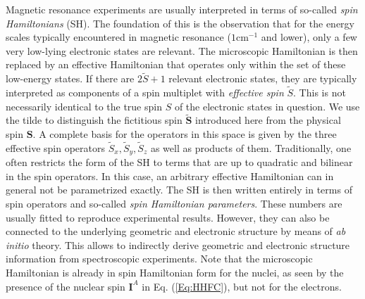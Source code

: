 Magnetic resonance experiments are usually interpreted in terms of so-called \emph{spin Hamiltonians} (SH). The foundation of this is the observation that for the energy scales typically encountered in magnetic resonance ($1\text{cm}^{-1}$ and lower), only a few very low-lying electronic states are relevant. The microscopic Hamiltonian is then replaced by an effective Hamiltonian that operates only within the set of these low-energy states. If there are $2\tilde{S}+1$ relevant electronic states, they are typically interpreted as components of a spin multiplet with \emph{effective spin} $\tilde{S}$. This is not necessarily identical to the true spin $S$ of the electronic states in question. We use the tilde to distinguish the fictitious spin $\tilde{\mathbf{S}}$ introduced here from the physical spin $\mathbf{S}$. A complete basis for the operators in this space is given by the three effective spin operators $\tilde{S}_x, \tilde{S}_y, \tilde{S}_z$ as well as products of them.\cite{Griff_1960_457, Griff_1963_316, HeuveS_2013_54113} Traditionally, one often restricts the form of the SH to terms that are up to quadratic and bilinear in the spin operators. In this case, an arbitrary effective Hamiltonian can in general not be parametrized exactly. The SH is then written entirely in terms of spin operators and so-called \emph{spin Hamiltonian parameters}. These numbers are usually fitted to reproduce experimental results. However, they can also be connected to the underlying geometric and electronic structure by means of \textit{ab initio} theory. This allows to indirectly derive geometric and electronic structure information from spectroscopic experiments.\cite{Neese_2017_11003} Note that the microscopic Hamiltonian is already in spin Hamiltonian form for the nuclei, as seen by the presence of the nuclear spin $\mathbf{I}^A$ in Eq. (\ref{Eq:HHFC}), but not for the electrons.

